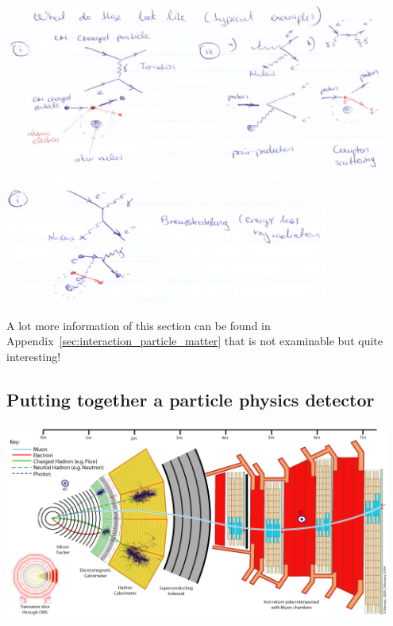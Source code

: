 \begin{center}
\includegraphics[width=0.95\textwidth]{fig/strongforce/matterinteractions/interactions1.jpg}\newline
\includegraphics[width=0.8\textwidth]{fig/strongforce/matterinteractions/interactions2.jpg}
\end{center}

A lot more information of this section can be found in Appendix~\ref{sec:interaction_particle_matter} that is not examinable but quite interesting!


\subsection{Putting together a particle physics detector}
\label{sec:detectorSummary}
\begin{center}
\includegraphics[width=0.95\textwidth]{fig/detector/cms_slice.png}
\end{center}


